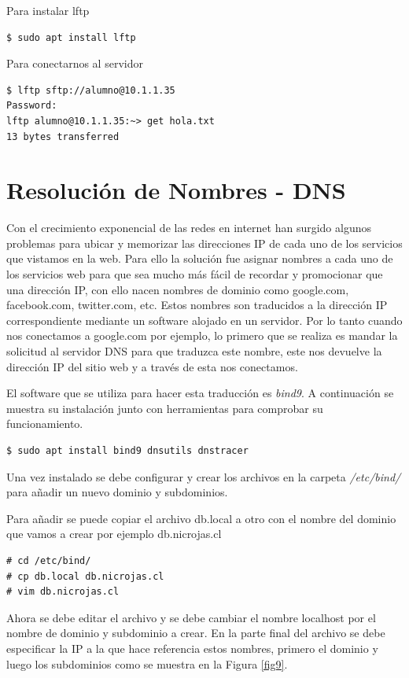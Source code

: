 \documentclass[12pt]{article}
\begin{document}
Para instalar lftp
\begin{lstlisting}[frame=single]
$ sudo apt install lftp
\end{lstlisting}

Para conectarnos al servidor 
\begin{lstlisting}[frame=single]
$ lftp sftp://alumno@10.1.1.35
Password:
lftp alumno@10.1.1.35:~> get hola.txt
13 bytes transferred
\end{lstlisting}

\section{Resolución de Nombres - DNS}

Con el crecimiento exponencial de las redes en internet han surgido algunos problemas para ubicar y memorizar las direcciones IP de cada uno de los servicios que vistamos en la web. Para ello la solución fue asignar nombres a cada uno de los servicios web para que sea mucho más fácil de recordar y promocionar que una dirección IP, con ello nacen nombres de dominio como google.com, facebook.com, twitter.com, etc. Estos nombres son traducidos a la dirección IP correspondiente mediante un software alojado en un servidor. Por lo tanto cuando nos conectamos a google.com por ejemplo, lo primero que se realiza es mandar la solicitud al servidor DNS para que traduzca este nombre, este nos devuelve la dirección IP del sitio web y a través de esta nos conectamos.  

El software que se utiliza para hacer esta traducción es \emph{bind9}. A continuación se muestra su instalación junto con herramientas para comprobar su funcionamiento.

\begin{lstlisting}[frame=single]
$ sudo apt install bind9 dnsutils dnstracer 
\end{lstlisting}

Una vez instalado se debe configurar y crear los archivos en la carpeta \emph{/etc/bind/} para añadir un nuevo dominio y subdominios.

Para añadir se puede copiar el archivo db.local a otro con el nombre del dominio que vamos a crear por ejemplo db.nicrojas.cl

\begin{lstlisting}[frame=single]
# cd /etc/bind/ 
# cp db.local db.nicrojas.cl
# vim db.nicrojas.cl
\end{lstlisting}

Ahora se debe editar el archivo y se debe cambiar el nombre localhost por el nombre de dominio y subdominio a crear. En la parte final del archivo se debe especificar la IP a la que hace referencia estos nombres, primero el dominio y luego los subdominios como se muestra en la Figura \ref{fig9}.
\end{document}

